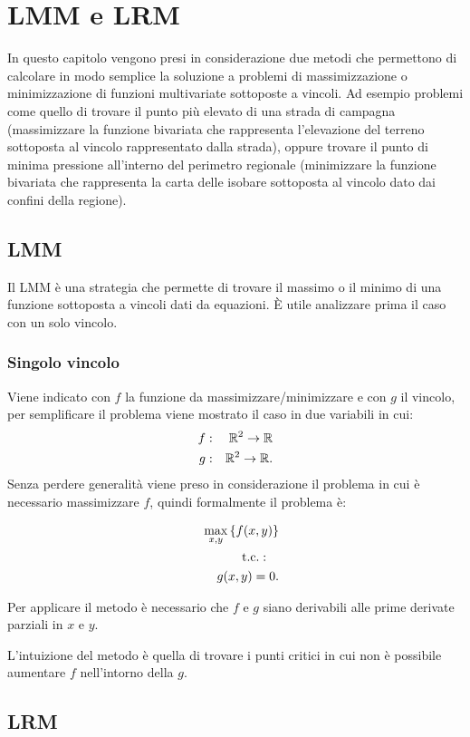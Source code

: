 \chapter{\acf{LMM} e \acf{LRM}}
In questo capitolo vengono presi in considerazione due metodi che
permettono di calcolare in modo semplice la soluzione a problemi
di massimizzazione o minimizzazione di funzioni multivariate
sottoposte a vincoli. Ad esempio problemi come quello di trovare il
punto più elevato di una strada di campagna (massimizzare la funzione
bivariata che rappresenta l'elevazione del terreno sottoposta al
vincolo rappresentato dalla strada), oppure trovare il punto di minima
pressione all'interno del perimetro regionale (minimizzare la funzione
bivariata che rappresenta la carta delle isobare sottoposta al vincolo
dato dai confini della regione).
\section{\acf{LMM}}
Il \ac{LMM} \`e una strategia che permette di trovare il massimo o il
minimo di una funzione sottoposta a vincoli dati da
equazioni. \`E utile analizzare prima il caso con un solo vincolo.
\subsection{Singolo vincolo}
Viene indicato con $f$ la funzione da
massimizzare/minimizzare e con $g$ il vincolo, per semplificare il
problema viene mostrato il caso in due variabili in cui:
\begin{eqnarray*}
f&:&\mathbb{R}^2\rightarrow\mathbb{R}\\
g&:&\mathbb{R}^2\rightarrow\mathbb{R}.
\end{eqnarray*}
Senza perdere generalit\`a viene preso in considerazione il problema
in cui \`e necessario massimizzare $f$, quindi formalmente il problema
\`e:
\begin{defi}
  \begin{eqnarray*}
    &&\max_{x,y}\left\{f(x,y)\right\}\\
    &&\mathrm{t.c.:}\quad{}\\
    &&\quad g(x,y)=0.
  \end{eqnarray*}
\end{defi}
Per applicare il metodo \`e necessario che $f$ e $g$ siano derivabili
alle prime derivate parziali in $x$ e $y$.

L'intuizione del metodo \`e quella di trovare i punti critici in cui
non \`e possibile aumentare $f$ nell'intorno della $g$.
\section{\acf{LRM}}